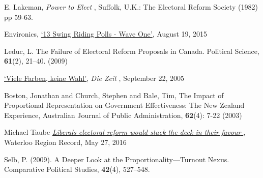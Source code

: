 \begin{thebibliography}{99}
E. Lakeman,
{ \emph{Power to Elect} }, Suffolk, U.K.: The Electoral Reform Society (1982) pp 59-63.

Environics,
{\color{blue} \href{http://www.votetogether.ca/pages/localpolling/}{`13 Swing Riding Polls - Wave One'}}, August 19, 2015

Leduc, L. The Failure of Electoral Reform Proposals in Canada. Political Science, \textbf{61}(2), 21–40. (2009)

{\color{blue} \href{http://www.zeit.de/2005/39/Wahl\_paradox}{`Viele Farben, keine Wahl'}},
 { \emph{Die Zeit} }, September 22, 2005


Boston, Jonathan and Church, Stephen and Bale, Tim, The Impact of Proportional Representation on Government Effectiveness: The New Zealand Experience,
Australian Journal of Public Administration,
\textbf{62}(4): 7-22 (2003)


 Michael Taube
{\color{blue} \href{http://www.therecord.com/opinion-story/6692466-liberals-electoral-reform-would-stack-the-deck-in-their-favour/}{ \emph{Liberals electoral reform would stack the deck in their favour} } },
Waterloo Region Record, May 27, 2016

 Selb, P. (2009). A Deeper Look at the Proportionality—Turnout Nexus. Comparative Political Studies,
 \textbf{42}(4), 527–548.



\end{thebibliography}
